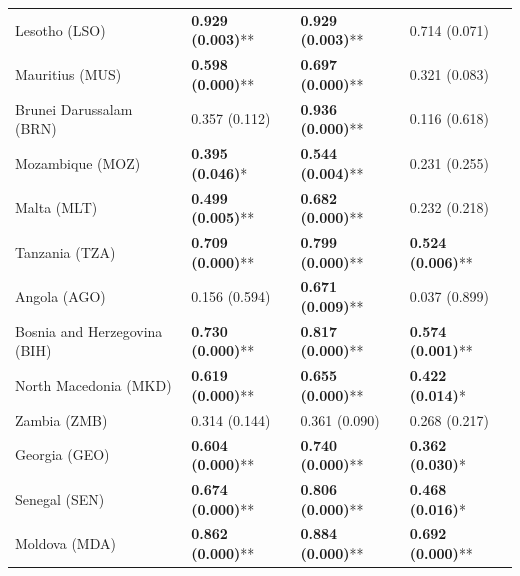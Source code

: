 \begin{longtable}{p{5cm}p{3cm}p{3cm}p{5cm}}
Lesotho (LSO) & \textcolor{atlLime600}{\textbf{0.929 (0.003)}**} & \textcolor{atlLime600}{\textbf{0.929 (0.003)}**} & \textcolor{atlOrange600}{0.714 (0.071)} \\
Mauritius (MUS) & \textcolor{atlLime600}{\textbf{0.598 (0.000)}**} & \textcolor{atlLime600}{\textbf{0.697 (0.000)}**} & \textcolor{atlOrange600}{0.321 (0.083)} \\
Brunei Darussalam (BRN) & \textcolor{atlOrange600}{0.357 (0.112)} & \textcolor{atlLime600}{\textbf{0.936 (0.000)}**} & \textcolor{atlOrange600}{0.116 (0.618)} \\
Mozambique (MOZ) & \textcolor{atlLime600}{\textbf{0.395 (0.046)}*} & \textcolor{atlLime600}{\textbf{0.544 (0.004)}**} & \textcolor{atlOrange600}{0.231 (0.255)} \\
Malta (MLT) & \textcolor{atlLime600}{\textbf{0.499 (0.005)}**} & \textcolor{atlLime600}{\textbf{0.682 (0.000)}**} & \textcolor{atlOrange600}{0.232 (0.218)} \\
Tanzania (TZA) & \textcolor{atlLime600}{\textbf{0.709 (0.000)}**} & \textcolor{atlLime600}{\textbf{0.799 (0.000)}**} & \textcolor{atlLime600}{\textbf{0.524 (0.006)}**} \\
Angola (AGO) & \textcolor{atlOrange600}{0.156 (0.594)} & \textcolor{atlLime600}{\textbf{0.671 (0.009)}**} & \textcolor{atlOrange600}{0.037 (0.899)} \\
Bosnia and Herzegovina (BIH) & \textcolor{atlLime600}{\textbf{0.730 (0.000)}**} & \textcolor{atlLime600}{\textbf{0.817 (0.000)}**} & \textcolor{atlLime600}{\textbf{0.574 (0.001)}**} \\
North Macedonia (MKD) & \textcolor{atlLime600}{\textbf{0.619 (0.000)}**} & \textcolor{atlLime600}{\textbf{0.655 (0.000)}**} & \textcolor{atlLime600}{\textbf{0.422 (0.014)}*} \\
Zambia (ZMB) & \textcolor{atlOrange600}{0.314 (0.144)} & \textcolor{atlOrange600}{0.361 (0.090)} & \textcolor{atlOrange600}{0.268 (0.217)} \\
Georgia (GEO) & \textcolor{atlLime600}{\textbf{0.604 (0.000)}**} & \textcolor{atlLime600}{\textbf{0.740 (0.000)}**} & \textcolor{atlLime600}{\textbf{0.362 (0.030)}*} \\
Senegal (SEN) & \textcolor{atlLime600}{\textbf{0.674 (0.000)}**} & \textcolor{atlLime600}{\textbf{0.806 (0.000)}**} & \textcolor{atlLime600}{\textbf{0.468 (0.016)}*} \\
Moldova (MDA) & \textcolor{atlLime600}{\textbf{0.862 (0.000)}**} & \textcolor{atlLime600}{\textbf{0.884 (0.000)}**} & \textcolor{atlLime600}{\textbf{0.692 (0.000)}**} \\

\end{longtable}
